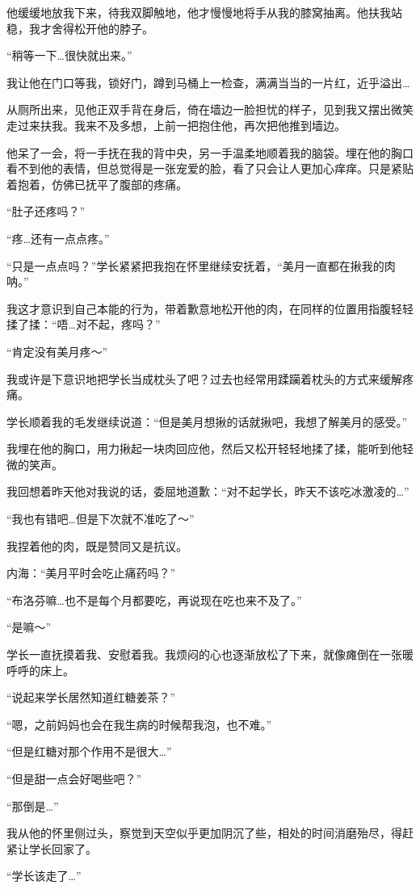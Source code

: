 他缓缓地放我下来，待我双脚触地，他才慢慢地将手从我的膝窝抽离。他扶我站稳，我才舍得松开他的脖子。

“稍等一下…很快就出来。”

我让他在门口等我，锁好门，蹲到马桶上一检查，满满当当的一片红，近乎溢出…

从厕所出来，见他正双手背在身后，倚在墙边一脸担忧的样子，见到我又摆出微笑走过来扶我。我来不及多想，上前一把抱住他，再次把他推到墙边。

他呆了一会，将一手抚在我的背中央，另一手温柔地顺着我的脑袋。埋在他的胸口看不到他的表情，但总觉得是一张宠爱的脸，看了只会让人更加心痒痒。只是紧贴着抱着，仿佛已抚平了腹部的疼痛。

“肚子还疼吗？”

“疼…还有一点点疼。”

“只是一点点吗？”学长紧紧把我抱在怀里继续安抚着，“美月一直都在揪我的肉呐。”

我这才意识到自己本能的行为，带着歉意地松开他的肉，在同样的位置用指腹轻轻揉了揉：“唔…对不起，疼吗？”

“肯定没有美月疼～”

我或许是下意识地把学长当成枕头了吧？过去也经常用蹂躏着枕头的方式来缓解疼痛。

学长顺着我的毛发继续说道：“但是美月想揪的话就揪吧，我想了解美月的感受。”

我埋在他的胸口，用力揪起一块肉回应他，然后又松开轻轻地揉了揉，能听到他轻微的笑声。

我回想着昨天他对我说的话，委屈地道歉：“对不起学长，昨天不该吃冰激凌的…”

“我也有错吧…但是下次就不准吃了～”

我捏着他的肉，既是赞同又是抗议。

内海：“美月平时会吃止痛药吗？”

“布洛芬嘛…也不是每个月都要吃，再说现在吃也来不及了。”

“是嘛～”

学长一直抚摸着我、安慰着我。我烦闷的心也逐渐放松了下来，就像瘫倒在一张暖呼呼的床上。

“说起来学长居然知道红糖姜茶？”

“嗯，之前妈妈也会在我生病的时候帮我泡，也不难。”

“但是红糖对那个作用不是很大…”

“但是甜一点会好喝些吧？”

“那倒是…”

我从他的怀里侧过头，察觉到天空似乎更加阴沉了些，相处的时间消磨殆尽，得赶紧让学长回家了。

“学长该走了…”

